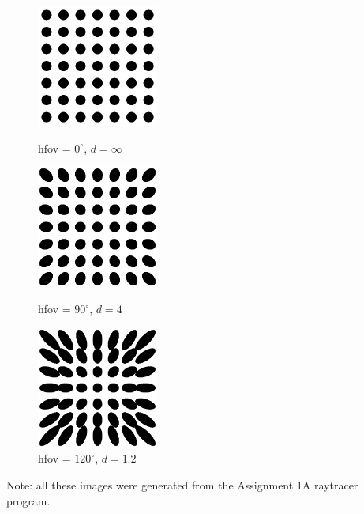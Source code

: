 \documentclass{assignment}
\begin{document}
\begin{enumerate}
       \begin{figure}[H]
        \centering
        \begin{minipage}[c]{0.3\linewidth}
         \centering
         \includegraphics[width=4cm]{img/e3a.png}
         \caption{hfov = \(0^\circ\), \(d = \infty\)}
        \end{minipage}
        \begin{minipage}[c]{0.3\linewidth}
         \centering
         \includegraphics[width=4cm]{img/e3b.png}
         \caption{hfov = \(90^\circ\), \(d = 4\)}
        \end{minipage}
        \begin{minipage}[c]{0.3\linewidth}
         \centering
         \includegraphics[width=4cm]{img/e3c.png}
         \caption{hfov = \(120^\circ\), \(d = 1.2\)}
        \end{minipage}
       \end{figure}

       Note: all these images were generated from the Assignment 1A raytracer program.
\end{enumerate}
\end{document}
